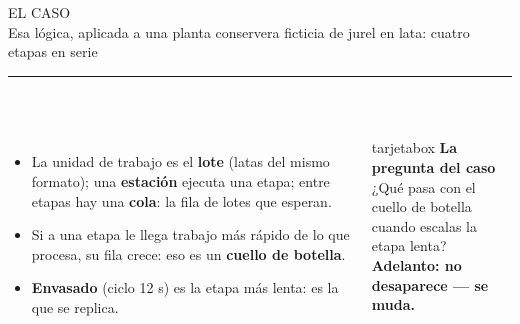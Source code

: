 \documentclass[aspectratio=169,10pt]{beamer}
\newcommand{\titulo}[2]{%
  \vspace{0.12cm}%
  {\dinfont\LARGE\color{marino}\MakeUppercase{#1}}\\[0.3ex]
  {\normalsize\color{grisazul}#2}\\[0.2ex]
  {\color{tealu}\rule{2.2cm}{2pt}}\\[0.6ex]}
\begin{document}
\begin{frame}
\titulo{El caso}{Esa lógica, aplicada a una planta conservera ficticia de jurel en lata: cuatro etapas en serie}
\begin{center}
\end{center}
\vspace{0.2cm}
\begin{columns}[T]
\begin{itemize}
  \item La unidad de trabajo es el \textbf{lote} (latas del mismo formato); una \textbf{estación} ejecuta una etapa; entre etapas hay una \textbf{cola}: la fila de lotes que esperan.
  \item Si a una etapa le llega trabajo más rápido de lo que procesa, su fila crece: eso es un \textbf{cuello de botella}.
  \item \textbf{Envasado} (ciclo 12 s) es la etapa más lenta: es la que se replica.
\end{itemize}
\begin{beamercolorbox}[sep=8pt, rounded=true]{tarjetabox}
{\small\bfseries\color{marino}La pregunta del caso}\\[3pt]
{\small\color{grisazul}¿Qué pasa con el cuello de botella cuando escalas la etapa lenta?}\\[4pt]
{\small\bfseries\color{tealu}Adelanto: no desaparece — se muda.}
\end{beamercolorbox}
\end{columns}
\end{frame}
\end{document}

